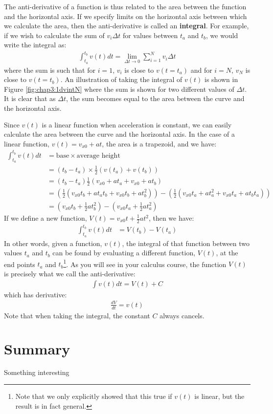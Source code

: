 The anti-derivative of a function is thus related to the area between the function and the horizontal axis. If we specify limits on the horizontal axis between which we calculate the area, then the anti-derivative is called an \textbf{integral}. For example, if we wish to calculate the sum of $v_i \Delta t$ for values between $t_a$ and $t_b$, we would write the integral as:
\begin{align*}
\int_{t_a}^{t_b}v(t) dt = \lim_{\Delta t\to 0}\sum_{i=1}^Nv_i\Delta t 
\end{align*}
where the sum is such that for $i=1$, $v_i$ is close to $v(t=t_a)$ and for $i=N$, $v_N$ is close to $v(t=t_b)$. An illustration of taking the integral of $v(t)$ is shown in Figure \ref{fig:chap3:1dvintN} where the sum is shown for two different values of $\Delta t$. It is clear that as $\Delta t$, the sum becomes equal to the area between the curve and the horizontal axis.


Since $v(t)$ is a linear function when acceleration is constant, we can easily calculate the area between the curve and the horizontal axis. In the case of a linear function, $v(t)=v_{x0}+at$, the area is a trapezoid, and we have:
\begin{align*}
\int_{t_a}^{t_b}v(t) dt &= \text{base}\times\text{average height}\\
&=(t_b-t_a)\times\frac{1}{2}\left(v(t_a)+v(t_b)\right)\\
&=(t_b-t_a)\frac{1}{2}(v_{x0}+at_a+v_{x0}+at_b)\\
&=\left( \frac{1}{2}(v_{x0}t_b+at_at_b+v_{x0}t_b+at_b^2)  \right)- \left( \frac{1}{2}(v_{x0}t_a+at_a^2+v_{x0}t_a+at_bt_a) \right)\\
&=\left( v_{x0}t_b+\frac{1}{2}at_b^2 \right)-\left( v_{x0}t_a+\frac{1}{2}at_a^2 \right)
\end{align*}
If we define a new function, $V(t)=v_{x0}t+\frac{1}{2}at^2$, then we have:
\begin{align*}
\int_{t_a}^{t_b}v(t) dt &= V(t_b) -V(t_a)
\end{align*}
In other words, given a function, $v(t)$, the integral of that function between two values $t_a$ and $t_b$ can be found by evaluating a different function, $V(t)$, at the end points $t_a$ and $t_b$\footnote{Note that we only explicitly showed that this true if $v(t)$ is linear, but the result is in fact general.}. As you will see in your calculus course, the function $V(t)$ is precisely what we call the anti-derivative:
\begin{align*}
\int v(t) dt= V(t) + C
\end{align*}
which has derivative:
\begin{align*}
\frac{dV}{dt}=v(t)
\end{align*}
Note that when taking the integral, the constant $C$ always cancels.  



\newpage
\section{Summary}
\vspace{2cm}
\begin{chapterSummary}
\item Something interesting
\end{chapterSummary}
